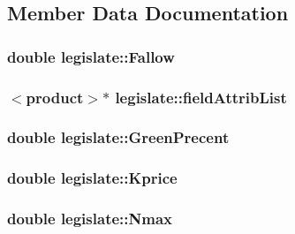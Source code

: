 \subsection{Member Data Documentation}
\hypertarget{classlegislate_a506189710b9609850f54a85ac8cbde4f}{
\subsubsection[{Fallow}]{\setlength{\rightskip}{0pt plus 5cm}double {\bf legislate::Fallow}}}
\label{classlegislate_a506189710b9609850f54a85ac8cbde4f}
\hypertarget{classlegislate_af44d0fa6a200c08d12117bb3826166af}{
\subsubsection[{fieldAttribList}]{$<${\bf product}$>$$\ast$ {\bf legislate::fieldAttribList}}}
\label{classlegislate_af44d0fa6a200c08d12117bb3826166af}
\hypertarget{classlegislate_a37450fa9b052799e02c330924e765698}{
\subsubsection[{GreenPrecent}]{\setlength{\rightskip}{0pt plus 5cm}double {\bf legislate::GreenPrecent}}}
\label{classlegislate_a37450fa9b052799e02c330924e765698}
\hypertarget{classlegislate_a6bad541fd82777f4f49643606735e8c3}{
\subsubsection[{Kprice}]{\setlength{\rightskip}{0pt plus 5cm}double {\bf legislate::Kprice}}}
\label{classlegislate_a6bad541fd82777f4f49643606735e8c3}
\hypertarget{classlegislate_ade274de9eef9fb1531405290cf95a293}{
\subsubsection[{Nmax}]{\setlength{\rightskip}{0pt plus 5cm}double {\bf legislate::Nmax}}}
